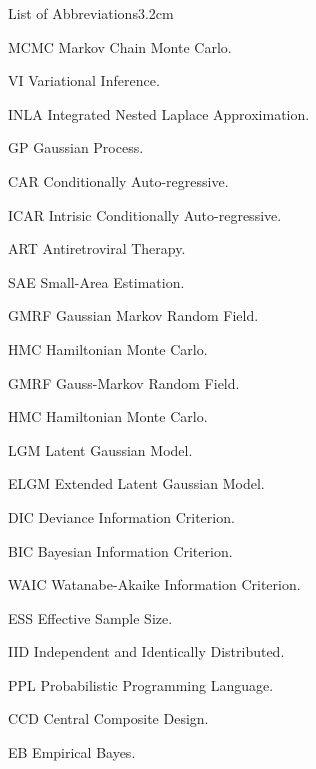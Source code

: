 \begin{mclistof}{List of Abbreviations}{3.2cm}
\item[MCMC] Markov Chain Monte Carlo.
\item[VI] Variational Inference.
\item[INLA] Integrated Nested Laplace Approximation.
\item[GP] Gaussian Process.
\item[CAR] Conditionally Auto-regressive.
\item[ICAR] Intrisic Conditionally Auto-regressive.
\item[ART] Antiretroviral Therapy.
\item[SAE] Small-Area Estimation.
\item[GMRF] Gaussian Markov Random Field.
\item[HMC] Hamiltonian Monte Carlo.
\item[GMRF] Gauss-Markov Random Field.
\item[HMC] Hamiltonian Monte Carlo.
\item[LGM] Latent Gaussian Model.
\item[ELGM] Extended Latent Gaussian Model.
\item[DIC] Deviance Information Criterion.
\item[BIC] Bayesian Information Criterion.
\item[WAIC] Watanabe-Akaike Information Criterion.
\item[ESS] Effective Sample Size.
\item[IID] Independent and Identically Distributed.
\item[PPL] Probabilistic Programming Language.
\item[CCD] Central Composite Design.
\item[EB] Empirical Bayes.

\end{mclistof} 
